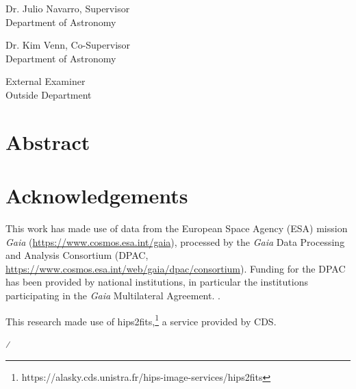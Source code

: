 \documentclass[12pt,oneside,letterpaper]{report}
\newcommand{\skipline}{\vspace{\baselineskip}}
\begin{document}
Dr. Julio Navarro, Supervisor\\
Department of Astronomy \\
\skipline

\noindent Dr. Kim Venn, Co-Supervisor\\
Department of Astronomy\\

\skipline

\noindent External Examiner \\
Outside Department

\chapter*{Abstract}

\chapter*{Acknowledgements}




This work has made use of data from the European Space Agency (ESA) mission
{\it Gaia} (\url{https://www.cosmos.esa.int/gaia}), processed by the {\it Gaia}
Data Processing and Analysis Consortium (DPAC,
\url{https://www.cosmos.esa.int/web/gaia/dpac/consortium}). Funding for the DPAC
has been provided by national institutions, in particular the institutions
participating in the {\it Gaia} Multilateral Agreement. 
\citep{gaiacollaboration+2016, gaiacollaboration+2023}.


This research made use of hips2fits,\footnote{https://alasky.cds.unistra.fr/hips-image-services/hips2fits} a service provided by CDS.






%
%
%
%
%
%
%
%
\newpage




\layout



⁄
\end{document}
